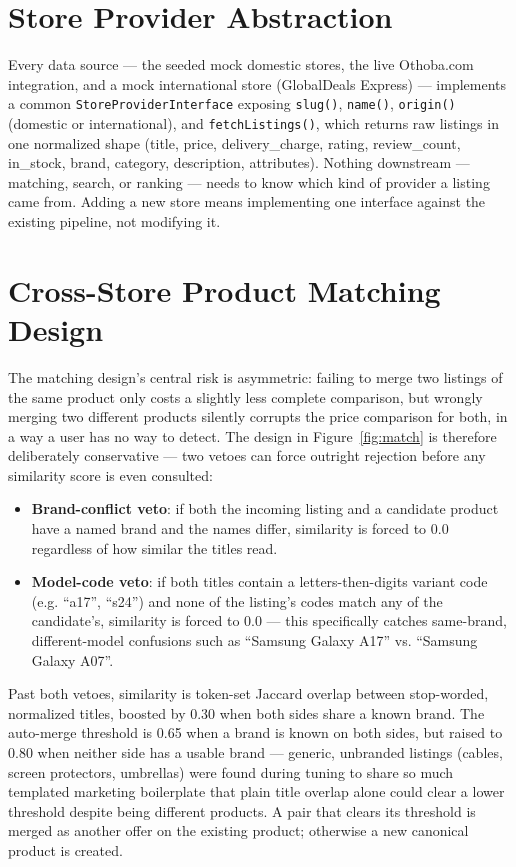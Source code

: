 \documentclass[12pt,a4paper]{report}
\begin{document}
\section{Store Provider Abstraction}
Every data source --- the seeded mock domestic stores, the live Othoba.com integration, and a mock
international store (GlobalDeals Express) --- implements a common \texttt{StoreProviderInterface} exposing
\texttt{slug()}, \texttt{name()}, \texttt{origin()} (domestic or international), and
\texttt{fetchListings()}, which returns raw listings in one normalized shape (title, price,
delivery\_charge, rating, review\_count, in\_stock, brand, category, description, attributes). Nothing
downstream --- matching, search, or ranking --- needs to know which kind of provider a listing came from.
Adding a new store means implementing one interface against the existing pipeline, not modifying it.

\section{Cross-Store Product Matching Design}
The matching design's central risk is asymmetric: failing to merge two listings of the same product only
costs a slightly less complete comparison, but wrongly merging two different products silently corrupts
the price comparison for both, in a way a user has no way to detect. The design in Figure~\ref{fig:match}
is therefore deliberately conservative --- two vetoes can force outright rejection before any similarity
score is even consulted:
\begin{itemize}
\item \textbf{Brand-conflict veto}: if both the incoming listing and a candidate product have a named
brand and the names differ, similarity is forced to 0.0 regardless of how similar the titles read.
\item \textbf{Model-code veto}: if both titles contain a letters-then-digits variant code (e.g. ``a17'',
``s24'') and none of the listing's codes match any of the candidate's, similarity is forced to 0.0 ---
this specifically catches same-brand, different-model confusions such as ``Samsung Galaxy A17'' vs.
``Samsung Galaxy A07''.
\end{itemize}

\noindent Past both vetoes, similarity is token-set Jaccard overlap between stop-worded, normalized
titles, boosted by 0.30 when both sides share a known brand. The auto-merge threshold is 0.65 when a brand
is known on both sides, but raised to 0.80 when neither side has a usable brand --- generic, unbranded
listings (cables, screen protectors, umbrellas) were found during tuning to share so much templated
marketing boilerplate that plain title overlap alone could clear a lower threshold despite being different
products. A pair that clears its threshold is merged as another offer on the existing product; otherwise a
new canonical product is created.
\end{document}
